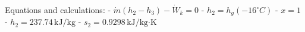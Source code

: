 Equations and calculations:
- \( \dot{m} (h_2 - h_3) - \dot{W}_k = 0 \)
- \( h_2 = h_g(-16^\circ C) \)
- \( x = 1 \)
- \( h_2 = 237.74 \, \text{kJ/kg} \)
- \( s_2 = 0.9298 \, \text{kJ/kg·K} \)
